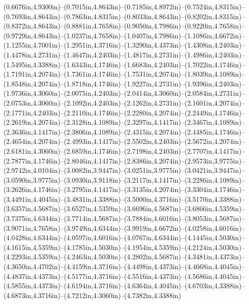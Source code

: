 (0.6676in,4.9300in)--(0.7015in,4.8643in)--(0.7185in,4.8972in)--(0.7524in,4.8315in)--(0.7693in,4.8643in)--(0.7863in,4.8315in)--(0.8033in,4.8643in)--(0.8202in,4.8315in)--(0.8372in,4.8643in)--(0.8881in,4.7658in)--(0.9050in,4.7986in)--(0.9220in,4.7658in)--(0.9729in,4.8643in)--(1.0237in,4.7658in)--(1.0407in,4.7986in)--(1.1086in,4.6672in)--(1.1255in,4.7001in)--(1.2951in,4.3716in)--(1.3290in,4.4373in)--(1.4308in,4.2403in)--(1.4478in,4.2731in)--(1.4647in,4.2403in)--(1.4817in,4.2731in)--(1.4986in,4.2403in)--(1.5495in,4.3388in)--(1.6343in,4.1746in)--(1.6683in,4.2403in)--(1.7022in,4.1746in)--(1.7191in,4.2074in)--(1.7361in,4.1746in)--(1.7531in,4.2074in)--(1.8039in,4.1089in)--(1.8548in,4.2074in)--(1.8718in,4.1746in)--(1.9227in,4.2731in)--(1.9396in,4.2403in)--(1.9736in,4.3060in)--(2.0075in,4.2403in)--(2.0414in,4.3060in)--(2.0584in,4.2731in)--(2.0753in,4.3060in)--(2.1092in,4.2403in)--(2.1262in,4.2731in)--(2.1601in,4.2074in)--(2.1771in,4.2403in)--(2.2110in,4.1746in)--(2.2280in,4.2074in)--(2.2449in,4.1746in)--(2.2619in,4.2074in)--(2.3128in,4.1089in)--(2.3297in,4.1417in)--(2.3467in,4.1089in)--(2.3636in,4.1417in)--(2.3806in,4.1089in)--(2.4315in,4.2074in)--(2.4485in,4.1746in)--(2.4654in,4.2074in)--(2.4993in,4.1417in)--(2.5502in,4.2403in)--(2.5672in,4.2074in)--(2.6181in,4.3060in)--(2.6859in,4.1746in)--(2.7198in,4.2403in)--(2.7707in,4.1417in)--(2.7877in,4.1746in)--(2.8046in,4.1417in)--(2.8386in,4.2074in)--(2.9573in,3.9775in)--(2.9742in,4.0104in)--(3.0082in,3.9447in)--(3.0251in,3.9775in)--(3.0421in,3.9447in)--(3.0590in,3.9775in)--(3.0930in,3.9118in)--(3.2117in,4.1417in)--(3.2286in,4.1089in)--(3.2626in,4.1746in)--(3.2795in,4.1417in)--(3.3135in,4.2074in)--(3.3304in,4.1746in)--(3.4491in,4.4045in)--(3.4831in,4.3388in)--(3.5000in,4.3716in)--(3.5170in,4.3388in)--(3.6357in,4.5687in)--(3.6527in,4.5359in)--(3.6696in,4.5687in)--(3.6866in,4.5359in)--(3.7375in,4.6344in)--(3.7714in,4.5687in)--(3.7884in,4.6016in)--(3.8053in,4.5687in)--(3.9071in,4.7658in)--(3.9749in,4.6344in)--(3.9919in,4.6672in)--(4.0258in,4.6016in)--(4.0428in,4.6344in)--(4.0597in,4.6016in)--(4.0767in,4.6344in)--(4.1445in,4.5030in)--(4.1615in,4.5359in)--(4.1785in,4.5030in)--(4.1954in,4.5359in)--(4.2124in,4.5030in)--(4.2293in,4.5359in)--(4.2463in,4.5030in)--(4.2802in,4.5687in)--(4.3481in,4.4373in)--(4.3650in,4.4702in)--(4.4159in,4.3716in)--(4.4498in,4.4373in)--(4.4668in,4.4045in)--(4.4837in,4.4373in)--(4.5177in,4.3716in)--(4.5516in,4.4373in)--(4.5686in,4.4045in)--(4.5855in,4.4373in)--(4.6194in,4.3716in)--(4.6364in,4.4045in)--(4.6703in,4.3388in)--(4.6873in,4.3716in)--(4.7212in,4.3060in)--(4.7382in,4.3388in) 
